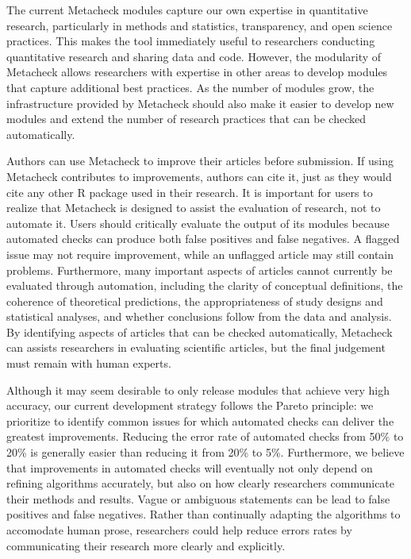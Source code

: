 \documentclass[
  letterpaper,
  12pt]{article}
\begin{document}
The current Metacheck modules capture our own expertise in quantitative
research, particularly in methods and statistics, transparency, and open
science practices. This makes the tool immediately useful to researchers
conducting quantitative research and sharing data and code. However, the
modularity of Metacheck allows researchers with expertise in other areas
to develop modules that capture additional best practices. As the number
of modules grow, the infrastructure provided by Metacheck should also
make it easier to develop new modules and extend the number of research
practices that can be checked automatically.

Authors can use Metacheck to improve their articles before submission.
If using Metacheck contributes to improvements, authors can cite it,
just as they would cite any other R package used in their research. It
is important for users to realize that Metacheck is designed to assist
the evaluation of research, not to automate it. Users should critically
evaluate the output of its modules because automated checks can produce
both false positives and false negatives. A flagged issue may not
require improvement, while an unflagged article may still contain
problems. Furthermore, many important aspects of articles cannot
currently be evaluated through automation, including the clarity of
conceptual definitions, the coherence of theoretical predictions, the
appropriateness of study designs and statistical analyses, and whether
conclusions follow from the data and analysis. By identifying aspects of
articles that can be checked automatically, Metacheck can assists
researchers in evaluating scientific articles, but the final judgement
must remain with human experts.

Although it may seem desirable to only release modules that achieve very
high accuracy, our current development strategy follows the Pareto
principle: we prioritize to identify common issues for which automated
checks can deliver the greatest improvements. Reducing the error rate of
automated checks from 50\% to 20\% is generally easier than reducing it
from 20\% to 5\%. Furthermore, we believe that improvements in automated
checks will eventually not only depend on refining algorithms
accurately, but also on how clearly researchers communicate their
methods and results. Vague or ambiguous statements can be lead to false
positives and false negatives. Rather than continually adapting the
algorithms to accomodate human prose, researchers could help reduce
errors rates by communicating their research more clearly and
explicitly.
\end{document}

